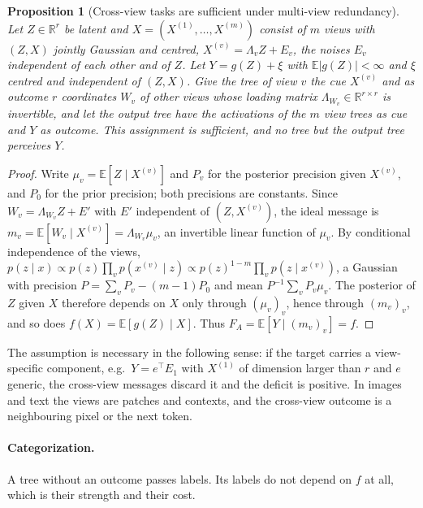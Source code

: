 \documentclass[11pt]{article}
\newtheorem{proposition}[theorem]{Proposition}
\theoremstyle{definition}
\theoremstyle{remark}
\newcommand{\R}{\mathbb{R}}
\newcommand{\E}{\mathbb{E}}
\begin{document}
\begin{proposition}[Cross-view tasks are sufficient under multi-view redundancy]\label{prop:multiview}
Let $Z\in\R^r$ be latent and $X=(X^{(1)},\dots,X^{(m)})$ consist of $m$ views with
$(Z,X)$ jointly Gaussian and centred, $X^{(v)}=\Lambda_vZ+E_v$, the noises $E_v$
independent of each other and of $Z$.  Let $Y=g(Z)+\xi$ with $\E|g(Z)|<\infty$ and $\xi$
centred and independent of $(Z,X)$.  Give the tree of view $v$ the cue $X^{(v)}$ and as
outcome $r$ coordinates $W_v$ of other views whose loading matrix $\Lambda_{W_v}\in\R^{r\times r}$
is invertible, and let the output tree have the activations of the $m$ view trees as cue
and $Y$ as outcome.  This assignment is sufficient, and no tree but the output tree
perceives $Y$.
\end{proposition}
\begin{proof}
Write $\mu_v=\E[Z\mid X^{(v)}]$ and $P_v$ for the posterior precision given $X^{(v)}$, and
$P_0$ for the prior precision; both precisions are constants.  Since $W_v=\Lambda_{W_v}Z+E'$
with $E'$ independent of $(Z,X^{(v)})$, the ideal message is
$m_v=\E[W_v\mid X^{(v)}]=\Lambda_{W_v}\mu_v$, an invertible linear function of $\mu_v$.
By conditional independence of the views,
$p(z\mid x)\propto p(z)\prod_vp(x^{(v)}\mid z)\propto p(z)^{1-m}\prod_vp(z\mid x^{(v)})$,
a Gaussian with precision $P=\sum_vP_v-(m-1)P_0$ and mean $P^{-1}\sum_vP_v\mu_v$.  The
posterior of $Z$ given $X$ therefore depends on $X$ only through $(\mu_v)_v$, hence through
$(m_v)_v$, and so does $f(X)=\E[g(Z)\mid X]$.  Thus $F_A=\E[Y\mid(m_v)_v]=f$.
\end{proof}

The assumption is necessary in the following sense: if the target carries a
view-specific component, e.g.\ $Y=e^\top E_1$ with $X^{(1)}$ of dimension larger than
$r$ and $e$ generic, the cross-view messages discard it and the deficit is positive.  In images and text the
views are patches and contexts, and the cross-view outcome is a neighbouring pixel or
the next token.

\paragraph{Categorization.}
A tree without an outcome passes labels.  Its labels do not depend on $f$ at all, which
is their strength and their cost.
\end{document}
